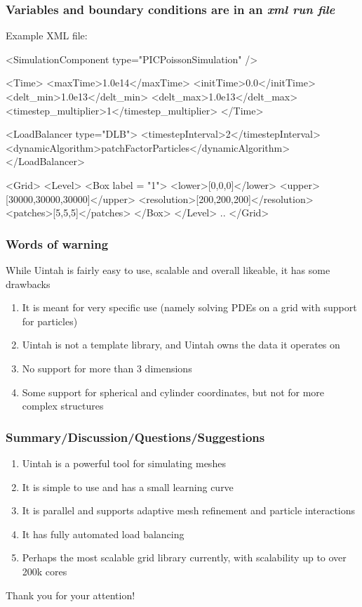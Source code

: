 \documentclass{beamer}
\begin{document}
\begin{frame}[fragile]
 \frametitle{Variables and boundary conditions are in an \emph{xml run file}}
 
Example XML file: 

 \begin{python}[basicstyle=\tiny]
   <SimulationComponent type="PICPoissonSimulation" />

   <Time>
       <maxTime>1.0e14</maxTime>
       <initTime>0.0</initTime>
       <delt_min>1.0e13</delt_min>
       <delt_max>1.0e13</delt_max>
       <timestep_multiplier>1</timestep_multiplier>
   </Time>

   <LoadBalancer type="DLB">
     <timestepInterval>2</timestepInterval>
     <dynamicAlgorithm>patchFactorParticles</dynamicAlgorithm>
   </LoadBalancer>

    <Grid>
       <Level>
           <Box label = "1">
              <lower>[0,0,0]</lower>
              <upper>[30000,30000,30000]</upper>
               <resolution>[200,200,200]</resolution>
              <patches>[5,5,5]</patches>
           </Box>
       </Level>
       ..
    </Grid>
 \end{python}

\end{frame}

\begin{frame}
 \frametitle{Words of warning}
 While Uintah is fairly easy to use, scalable and overall likeable, it has some drawbacks
 \begin{enumerate}
  \item It is meant for very specific use (namely solving PDEs on a grid with support for particles)
  \item Uintah is not a template library, and Uintah owns the data it operates on
  \item No support for more than 3 dimensions
  \item Some support for spherical and cylinder coordinates, but not for more complex structures
 \end{enumerate}
\end{frame}

\begin{frame}
 \frametitle{Summary/Discussion/Questions/Suggestions}
 \begin{enumerate}
  \item Uintah is a powerful tool for simulating meshes
  \item It is simple to use and has a small learning curve
  \item It is parallel and supports adaptive mesh refinement and particle interactions
  \item It has fully automated load balancing
  \item Perhaps the most scalable grid library currently, with scalability up to over 200k cores
 \end{enumerate}
 
 Thank you for your attention!
\end{frame}
\end{document}
